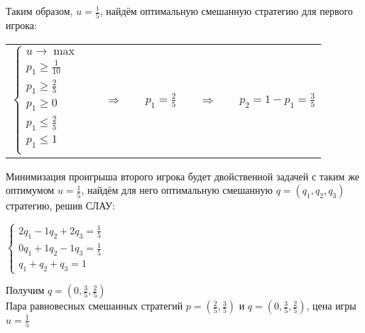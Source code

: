\documentclass{article}
\newcommand{\rimpl}{\quad \Rightarrow \quad}
\begin{document}
	Таким образом, $u = \frac{1}{5}$, найдём оптимальную смешанную стратегию для первого игрока:
	\begin{center}
		\begin{tabular}{ccccc}
			$\begin{cases}
			u \rightarrow \max \\
			p_1 \geq \frac{1}{10} \\
			p_1 \geq \frac{2}{5} \\
			p_1 \geq 0 \\
			p_1  \leq \frac{2}{5} \\
			p_1 \leq 1 \\
			\end{cases}$ 
			& $\rimpl$ &
			$p_1 = \frac{2}{5}$ 
			& $\rimpl$ &
			$p_2 = 1 - p_1 = \frac{3}{5}$
			
		\end{tabular}
	\end{center}

	Минимизация проигрыша второго игрока будет двойственной задачей с таким же оптимумом $u = \frac{1}{5}$, найдём для него оптимальную смешанную $q = (q_1, q_2, q_3)$ стратегию, решив СЛАУ: 
	\begin{center}
		$\begin{cases}
		2q_1 - 1q_2 + 2q_3 = \frac{1}{5} \\
		0q_1 + 1q_2 - 1q_3 = \frac{1}{5} \\
		q_1 + q_2 + q_3 = 1	
		\end{cases}$
	\end{center}
	Получим $q = (0, \frac{3}{5}, \frac{2}{5})$\\
	Пара равновесных смешанных стратегий $p = (\frac{2}{5}, \frac{3}{5})$ и $q = (0, \frac{3}{5}, \frac{2}{5})$, цена игры $u = \frac{1}{5}$ 


	
\end{document}
